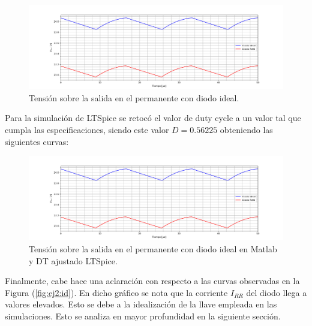 \begin{figure}[H]
	\centering
	\includegraphics[width=0.9\linewidth]{ImagenesEjercicio-2/vo_diodo_ideal.png}
	\caption{Tensión sobre la salida en el permanente con diodo ideal.}
	\label{fig:ej2:vo_diodo_ideal}
\end{figure}
Para la simulación de LTSpice se retocó el valor de duty cycle a un valor tal que cumpla las especificaciones, siendo este valor $D=0.56225$ obteniendo las siguientes curvas:
\begin{figure}[H]
	\centering
	\includegraphics[width=0.9\linewidth]{ImagenesEjercicio-2/vo_diodo_ideal_sim.png}
	\caption{Tensión sobre la salida en el permanente con diodo ideal en Matlab y DT ajustado LTSpice.}
	\label{fig:ej2:vo_diodo_ideal_ltspice}
\end{figure}

Finalmente, cabe hace una aclaración con respecto a las curvas observadas en la Figura (\ref{fig:ej2:id}). En dicho gráfico se nota que la corriente $I_{RR}$ del diodo llega a valores elevados. Esto se debe a la idealización de la llave empleada en las simulaciones. Esto se analiza en mayor profundidad en la siguiente sección.

